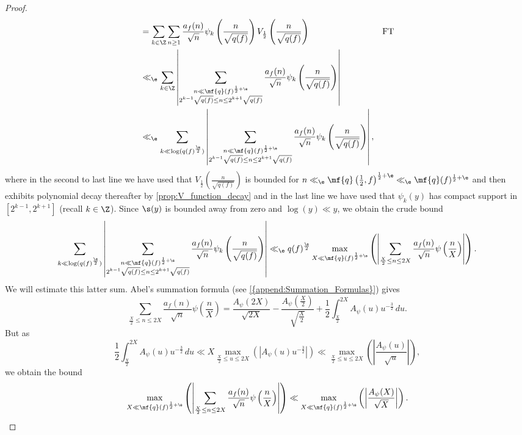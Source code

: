 \begin{proof}
\begin{align*}
        &= \sum_{k \in \Z}\sum_{n \ge 1}\frac{a_{f}(n)}{\sqrt{n}}\psi_{k}\left(\frac{n}{\sqrt{q(f)}}\right)V_{\frac{1}{2}}\left(\frac{n}{\sqrt{q(f)}}\right) && \text{FT} \\
        &\ll_{\e} \sum_{k \in \Z}\left|\sum_{\substack{n \ll \mf{q}(f)^{\frac{1}{2}+\e} \\ 2^{k-1}\sqrt{q(f)} \le n \le 2^{k+1}\sqrt{q(f)}}}\frac{a_{f}(n)}{\sqrt{n}}\psi_{k}\left(\frac{n}{\sqrt{q(f)}}\right)\right| \\
        &\ll_{\e} \sum_{k \ll \log(q(f)^{\frac{\e}{2}})}\left|\sum_{\substack{n \ll \mf{q}(f)^{\frac{1}{2}+\e} \\ 2^{k-1}\sqrt{q(f)} \le n \le 2^{k+1}\sqrt{q(f)}}}\frac{a_{f}(n)}{\sqrt{n}}\psi_{k}\left(\frac{n}{\sqrt{q(f)}}\right)\right|,
      \end{align*}
      where in the second to last line we have used that $V_{\frac{1}{2}}\left(\frac{n}{\sqrt{q(f)}}\right)$ is bounded for $n \ll_{\e} \mf{q}\left(\frac{1}{2},f\right)^{\frac{1}{2}+\e} \ll_{\e} \mf{q}(f)^{\frac{1}{2}+\e}$ and then exhibits polynomial decay thereafter by \cref{prop:V_function_decay} and in the last line we have used that $\psi_{k}(y)$ has compact support in $[2^{k-1},2^{k+1}]$ (recall $k \in \Z$). Since $\s(y)$ is bounded away from zero and $\log(y) \ll y$, we obtain the crude bound
      \[
        \sum_{k \ll \log(q(f)^{\frac{\e}{2}})}\left|\sum_{\substack{n \ll \mf{q}(f)^{\frac{1}{2}+\e} \\ 2^{k-1}\sqrt{q(f)} \le n \le 2^{k+1}\sqrt{q(f)}}}\frac{a_{f}(n)}{\sqrt{n}}\psi_{k}\left(\frac{n}{\sqrt{q(f)}}\right)\right| \ll_{\e} q(f)^{\frac{\e}{2}}\max_{X \ll \mf{q}(f)^{\frac{1}{2}+\e}}\left(\left|\sum_{\frac{X}{2} \le n \le 2X}\frac{a_{f}(n)}{\sqrt{n}}\psi\left(\frac{n}{X}\right)\right|\right).
      \]
      We will estimate this latter sum. Abel's summation formula (see \cref{{append:Summation_Formulas}}) gives
      \[
        \sum_{\frac{X}{2} \le n \le 2X}\frac{a_{f}(n)}{\sqrt{n}}\psi\left(\frac{n}{X}\right) = \frac{A_{\psi}(2X)}{\sqrt{2X}}-\frac{A_{\psi}\left(\frac{X}{2}\right)}{\sqrt{\frac{X}{2}}}+\frac{1}{2}\int_{\frac{X}{2}}^{2X}A_{\psi}(u)u^{-\frac{3}{2}}\,du.
      \]
      But as
      \[
        \frac{1}{2}\int_{\frac{X}{2}}^{2X}A_{\psi}(u)u^{-\frac{3}{2}}\,du \ll X\max_{\frac{X}{2} \le u \le 2X}\left(\left|A_{\psi}(u)u^{-\frac{3}{2}}\right|\right) \ll \max_{\frac{X}{2} \le u \le 2X}\left(\left|\frac{A_{\psi}(u)}{\sqrt{u}}\right|\right),
      \]
      we obtain the bound
      \[
        \max_{X \ll \mf{q}(f)^{\frac{1}{2}+\e}}\left(\left|\sum_{\frac{X}{2} \le n \le 2X}\frac{a_{f}(n)}{\sqrt{n}}\psi\left(\frac{n}{X}\right)\right|\right) \ll \max_{X \ll \mf{q}(f)^{\frac{1}{2}+\e}}\left(\left|\frac{A_{\psi}(X)}{\sqrt{X}}\right|\right).
\]
\end{proof}
